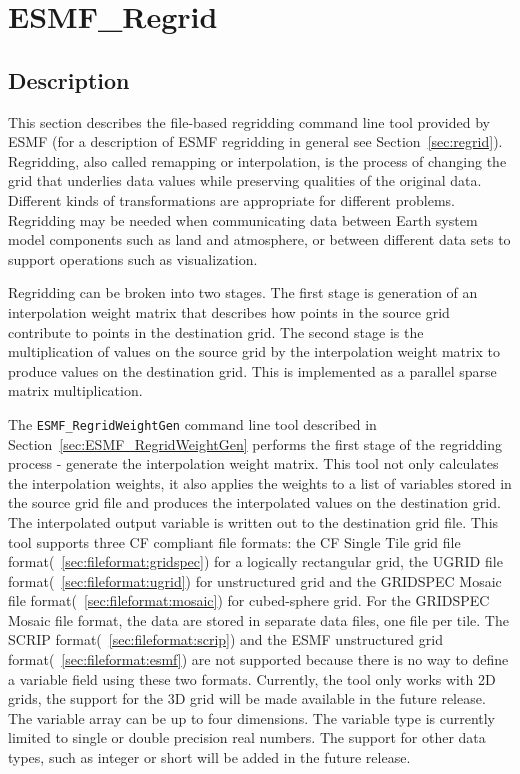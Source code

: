 
\section{ESMF\_Regrid}
\label{sec:ESMF_Regrid}

\subsection{Description}

This section describes the file-based regridding command line tool provided by ESMF (for a description of ESMF regridding in general see Section~\ref{sec:regrid}). Regridding, also called remapping or interpolation, is the process of changing the grid that underlies data values while preserving qualities of the original data. Different kinds of transformations are appropriate for different problems. Regridding may be needed when communicating data between Earth system model components such as land and atmosphere, or between different data sets to support operations such as visualization. 

Regridding can be broken into two stages. The first stage is generation of an interpolation weight matrix that describes how points in
the source grid contribute to points in the destination grid. The second stage is the multiplication of values on the source grid by the
interpolation weight matrix to produce values on the destination grid. This is implemented as a parallel sparse matrix multiplication.

The {\tt ESMF\_RegridWeightGen} command line tool described in Section~\ref{sec:ESMF_RegridWeightGen} 
performs the first stage of the regridding process - generate the interpolation weight matrix. 
This tool not only calculates the interpolation weights, it also applies the
weights to a list of variables 
stored in the source grid file and produces the interpolated values on the destination grid. 
The interpolated output variable is written out to the destination grid file.  This tool 
supports three CF compliant file formats: the CF Single Tile grid file format(~\ref{sec:fileformat:gridspec}) for
a logically rectangular grid, the UGRID file
format(~\ref{sec:fileformat:ugrid}) for unstructured grid and the GRIDSPEC
Mosaic file format(~\ref{sec:fileformat:mosaic}) for cubed-sphere grid.  For
the GRIDSPEC Mosaic file format, the data are stored in separate data files,
one file per tile.   
The SCRIP format(~\ref{sec:fileformat:scrip}) and the ESMF unstructured grid format(~\ref{sec:fileformat:esmf}) are not supported because there is no way to define a variable field using these two formats. Currently, the tool only works with 2D grids, the support for the 3D grid will be 
made available in the future release.  The variable array can be up to four dimensions.  The
variable type is currently limited to single or double precision real numbers.  The support for 
other data types, such as integer or short will be added in the future release.  

